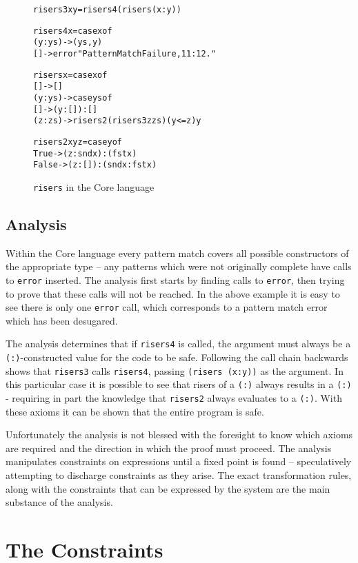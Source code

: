 \documentclass[preprint]{sigplanconf}
\newcommand{\T}[1]{\texttt{#1}}
\newenvironment{code}{\begin{alltt}\small}{\end{alltt}}
\begin{document}
\begin{figure}
\begin{code}
risers3 x y = risers4 (risers (x : y))

risers4 x = case x of
    (y:ys) -> (ys, y)
    [] -> error "Pattern Match Failure, 11:12."

risers x = case x of
    [] -> []
    (y:ys) ->  case ys of
         [] -> (y : []) : []
         (z:zs) -> risers2 (risers3 z zs) (y <= z) y

risers2 x y z =  case y of
    True -> (z : snd x) : (fst x)
    False -> (z : []) : (snd x : fst x)
\end{code}
\caption{\T{risers} in the Core language}
\label{fig:risers_core}
\end{figure}

\subsection{Analysis}

Within the Core language every pattern match covers all possible constructors of the appropriate type -- any patterns which were not originally complete have calls to \T{error} inserted. The analysis first starts by finding calls to \T{error}, then trying to prove that these calls will not be reached. In the above example it is easy to see there is only one \T{error} call, which corresponds to a pattern match error which has been desugared.

The analysis determines that if \T{risers4} is called, the argument must always be a \T{(:)}-constructed value for the code to be safe. Following the call chain backwards shows that \T{risers3} calls \T{risers4}, passing \T{(risers (x:y))} as the argument. In this particular case it is possible to see that risers of a \T{(:)} always results in a \T{(:)} - requiring in part the knowledge that \T{risers2} always evaluates to a \T{(:)}. With these axioms it can be shown that the entire program is safe.

Unfortunately the analysis is not blessed with the foresight to know which axioms are required and the direction in which the proof must proceed. The analysis manipulates constraints on expressions until a fixed point is found -- speculatively attempting to discharge constraints as they arise. The exact transformation rules, along with the constraints that can be expressed by the system are the main substance of the analysis.


\section{The Constraints}
\label{sec:manipulate}
\end{document}
